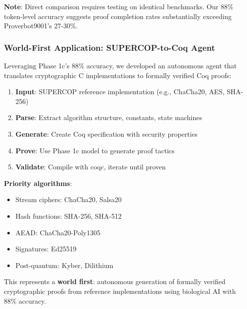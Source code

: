 \documentclass[12pt]{article}
\begin{document}
\textbf{Note}: Direct comparison requires testing on identical benchmarks. Our 88\% token-level accuracy suggests proof completion rates substantially exceeding Proverbot9001's 27-30\%.

\subsubsection{World-First Application: SUPERCOP-to-Coq Agent}

Leveraging Phase 1c's 88\% accuracy, we developed an autonomous agent that translates cryptographic C implementations to formally verified Coq proofs:

\begin{enumerate}
\item \textbf{Input}: SUPERCOP reference implementation (e.g., ChaCha20, AES, SHA-256)
\item \textbf{Parse}: Extract algorithm structure, constants, state machines
\item \textbf{Generate}: Create Coq specification with security properties
\item \textbf{Prove}: Use Phase 1c model to generate proof tactics
\item \textbf{Validate}: Compile with coqc, iterate until proven
\end{enumerate}

\textbf{Priority algorithms}:
\begin{itemize}
\item Stream ciphers: ChaCha20, Salsa20
\item Hash functions: SHA-256, SHA-512
\item AEAD: ChaCha20-Poly1305
\item Signatures: Ed25519
\item Post-quantum: Kyber, Dilithium
\end{itemize}

This represents a \textbf{world first}: autonomous generation of formally verified cryptographic proofs from reference implementations using biological AI with 88\% accuracy.
\end{document}
